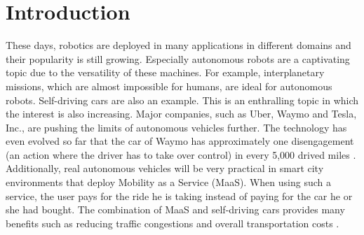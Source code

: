 \documentclass[conference,a4paper]{IEEEtran}
\begin{document}
\begin{abstract}
\lipsum[1]

\end{abstract}


%
\IEEEpeerreviewmaketitle



\section{Introduction}
These days, robotics are deployed in many applications in different domains and their popularity is still growing. Especially autonomous robots are a captivating topic due to the versatility of these machines. For example, interplanetary missions, which are almost impossible for humans, are ideal for autonomous robots. 
Self-driving cars are also an example. This is an enthralling topic in which the interest is also increasing. Major companies, such as Uber, Waymo and Tesla, Inc., are pushing the limits of autonomous vehicles further. The technology has even evolved so far that the car of Waymo has approximately one disengagement (an action where the driver has to take over control) in every 5,000 drived miles \cite{Mui2017}. 
Additionally, real autonomous vehicles will be very practical in smart city environments that deploy Mobility as a Service (MaaS). When using such a service, the user pays for the ride he is taking instead of paying for the car he or she had bought. The combination of MaaS and self-driving cars provides many benefits such as reducing traffic congestions and overall transportation costs \cite{Speculations}.
\end{document}
